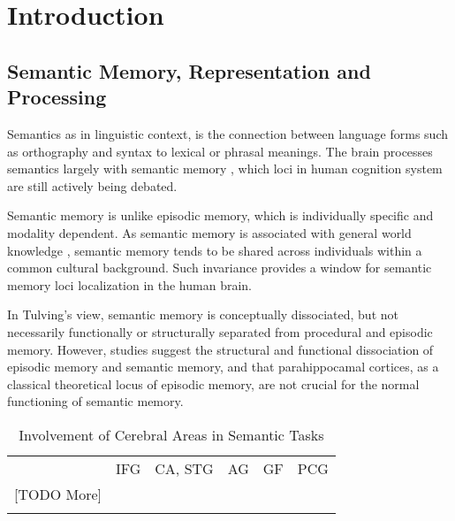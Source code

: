 \chapter{Introduction} 

\label{chap:introduction} 

\section{Semantic Memory, Representation and Processing} 

Semantics as in linguistic context, is the connection between language forms such as orthography and syntax to lexical or phrasal meanings. The brain processes semantics largely with semantic memory \parencite{tulvingEpisodicSemanticMemory1972}, which loci in human cognition system are still actively being debated. 

Semantic memory is unlike episodic memory, which is individually specific and modality dependent. As semantic memory is associated with general world knowledge \parencite{mcraeSemanticMemory2013}, semantic memory tends to be shared across individuals within a common cultural background. Such invariance provides a window for semantic memory loci localization in the human brain. 

In Tulving's view, semantic memory is conceptually dissociated, but not necessarily functionally or structurally separated from procedural and episodic memory. However, studies \parencite{vargha-khademDifferentialEffectsEarly1997} suggest the structural and functional dissociation of episodic memory and semantic memory, and that parahippocamal cortices, as a classical theoretical locus of episodic memory, are not crucial for the normal functioning of semantic memory.

\begin{table}
\caption{Involvement of Cerebral Areas in Semantic Tasks}
\label{tab:distributedareastudysynthesis}
\centering

\begin{tabularx}{\textwidth}{@{} L *{5}{X} @{}}
\toprule
{} &  &  &  &  & \\
\midrule
\cite{tsukiuraDissociableRolesBilateral2006} & IFG & CA, STG & AG & GF & PCG \\
{[}TODO More{]} &  &  &  &  &  \\
\bottomrule \\
\end{tabularx}
\end{table}
    

